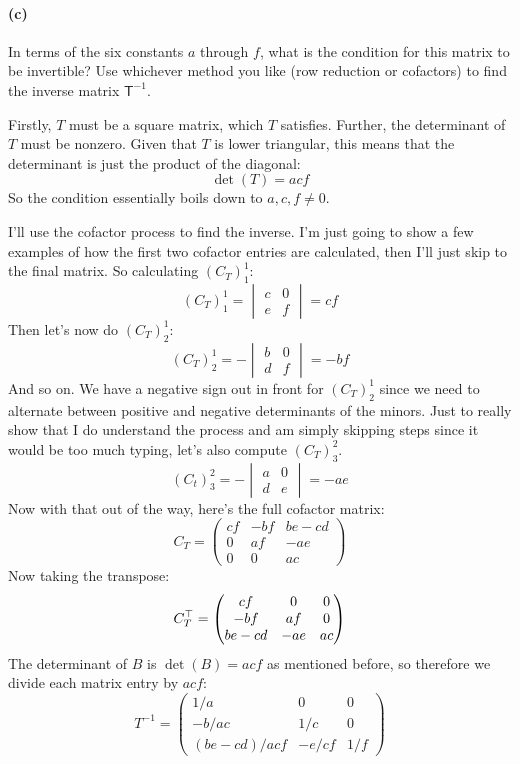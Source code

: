 \documentclass{article}
\begin{document}
\paragraph{(c)}
In terms of the six constants $a$ through $f$, what is the condition for this matrix to be invertible?  Use whichever method you like (row reduction or cofactors)
to find the inverse matrix $\mathsf{T}^{-1}$.

\begin{solution}
	Firstly, $T$ must be a square matrix, which $T$ satisfies. Further, the determinant of $T$ must be nonzero. 
	Given that $T$ is lower triangular, this means that the determinant is just the product of the diagonal:
	\[
	\det(T) = acf
	\] 
	So the condition essentially boils down to $a, c, f \neq 0 $. 

	I'll use the cofactor process to find the inverse. I'm just going to show a few examples of how the first
	two cofactor entries are calculated, then I'll just skip to the final matrix. So calculating $(C_T)^1_1$:
	\[
		(C_T)^1_1 = \begin{vmatrix} c & 0\\ e & f\end{vmatrix} = cf
	\] 
	Then let's now do $(C_T)^1_2$:
	\[
		(C_T)^1_2 = -\begin{vmatrix} b & 0 \\ d & f\end{vmatrix} = -bf
	\] 
	And so on. We have a negative sign out in front for $(C_T)^1_2$ since we need to alternate between positive
	and negative determinants of the minors. Just to really show that I do understand the 
	process and am simply skipping steps since it would be too much typing, let's also compute 
	$(C_T)^2_3$.
	\[
		(C_t)^2_3 = -\begin{vmatrix} a & 0 \\ d &e\end{vmatrix} = -ae
	\] 
	Now with that out of the way, here's the full cofactor matrix:
	\[
		C_T = \begin{pmatrix} cf & -bf & be-cd\\0&af&-ae\\0&0&ac \end{pmatrix} 
	\] 
	Now taking the transpose:
	\[
		C_T^\top = \begin{pmatrix} cf & 0&0\\-bf & af & 0\\be-cd & -ae & ac \end{pmatrix} 
	\] 
	The determinant of $B$ is $\det(B) = acf$ as mentioned before, so therefore we divide each matrix entry 
	by $acf$: 
	\[
		T^{-1} = \begin{pmatrix} 1/a & 0&0\\-b / ac & 1 / c &0\\(be - cd) / acf & -e / cf& 1 / f\end{pmatrix} 
	\] 

\end{solution}
\end{document}
